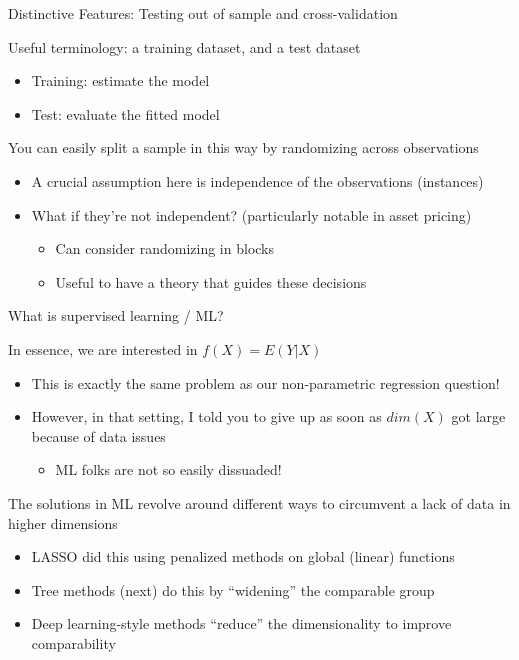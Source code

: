 \documentclass[notes,11pt, aspectratio=169]{beamer}
\newenvironment{wideitemize}{\itemize\addtolength{\itemsep}{10pt}}{\enditemize}
\begin{document}
\begin{frame}{Distinctive Features: Testing out of sample and cross-validation}
  \begin{wideitemize}
  \item Useful terminology: a training dataset, and a test dataset
    \begin{itemize}
    \item Training: estimate the model
    \item Test: evaluate the fitted model
    \end{itemize}
  \item You can easily split a sample in this way by randomizing across observations
    \begin{itemize}
    \item A crucial assumption here is independence of the observations (instances)
    \item What if they're not independent? (particularly notable in asset pricing)
      \begin{itemize}
      \item Can consider randomizing in blocks
      \item Useful to have a theory that guides these decisions
      \end{itemize}
    \end{itemize}
  \end{wideitemize}
\end{frame}



\begin{frame}{What is supervised learning / ML?}
  \begin{wideitemize}
  \item In essence, we are interested in $f(X) = E(Y | X)$
    \begin{itemize}
    \item This is exactly the same problem as our non-parametric regression question!
    \item However, in that setting, I told you to give up as soon as $dim(X)$ got large because of data issues
      \begin{itemize}
      \item ML folks are not so easily dissuaded!
      \end{itemize}
    \end{itemize}
  \item The solutions in ML revolve around different ways to circumvent a lack of data in higher dimensions
    \begin{itemize}
    \item LASSO did this using penalized methods on global (linear) functions
    \item Tree methods (next) do this by ``widening'' the comparable group
    \item Deep learning-style methods ``reduce'' the dimensionality to improve comparability
    \end{itemize}
  \end{wideitemize}
\end{frame}
\end{document}
